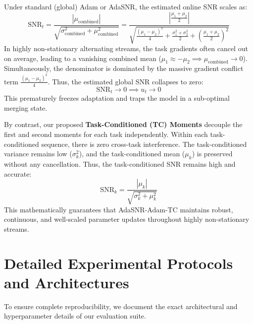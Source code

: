 \documentclass{article}
\theoremstyle{plain}
\theoremstyle{definition}
\theoremstyle{remark}
\begin{document}
Under standard (global) Adam or AdaSNR, the estimated online SNR scales as:
\begin{equation}
    \text{SNR}_t = \frac{|\mu_{\text{combined}}|}{\sqrt{\sigma_{\text{combined}}^2 + \mu_{\text{combined}}^2}} = \frac{\left| \frac{\mu_1 + \mu_2}{2} \right|}{\sqrt{\frac{(\mu_1 - \mu_2)^2}{4} + \frac{\sigma_1^2 + \sigma_2^2}{2} + \left(\frac{\mu_1 + \mu_2}{2}\right)^2}}
\end{equation}
In highly non-stationary alternating streams, the task gradients often cancel out on average, leading to a vanishing combined mean ($\mu_1 \approx -\mu_2 \implies \mu_{\text{combined}} \to 0$). Simultaneously, the denominator is dominated by the massive gradient conflict term $\frac{(\mu_1 - \mu_2)^2}{4}$. Thus, the estimated global SNR collapses to zero:
\begin{equation}
    \text{SNR}_t \to 0 \implies u_t \to 0
\end{equation}
This prematurely freezes adaptation and traps the model in a sub-optimal merging state.

By contrast, our proposed \textbf{Task-Conditioned (TC) Moments} decouple the first and second moments for each task independently. Within each task-conditioned sequence, there is zero cross-task interference. The task-conditioned variance remains low ($\sigma_k^2$), and the task-conditioned mean ($\mu_k$) is preserved without any cancellation. Thus, the task-conditioned SNR remains high and accurate:
\begin{equation}
    \text{SNR}_k = \frac{|\mu_k|}{\sqrt{\sigma_k^2 + \mu_k^2}}
\end{equation}
This mathematically guarantees that AdaSNR-Adam-TC maintains robust, continuous, and well-scaled parameter updates throughout highly non-stationary streams.

\section{Detailed Experimental Protocols and Architectures}
\label{app:protocols}

To ensure complete reproducibility, we document the exact architectural and hyperparameter details of our evaluation suite.
\end{document}
